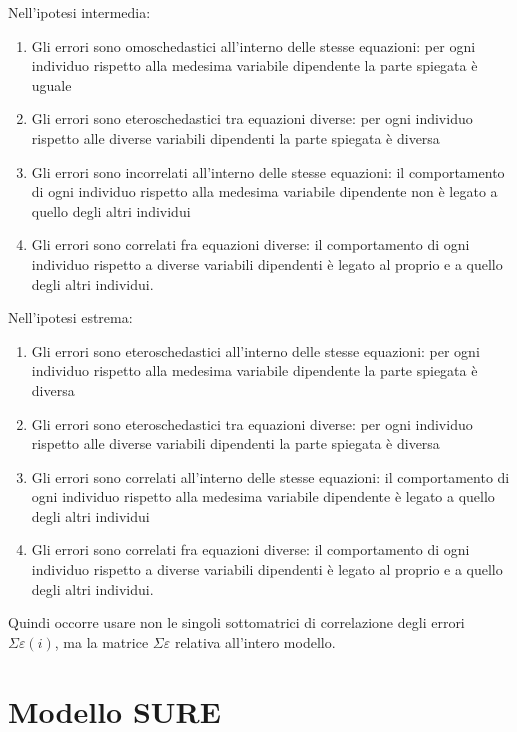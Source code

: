 \documentclass[a4page, 11pt]{article} %
\begin{document}
Nell’ipotesi intermedia:
\begin{enumerate}

\item Gli errori sono omoschedastici all’interno delle stesse equazioni: per ogni individuo rispetto alla medesima variabile dipendente la parte spiegata è uguale
\item Gli errori sono eteroschedastici tra equazioni diverse: per ogni individuo rispetto alle diverse variabili dipendenti la parte spiegata è diversa
\item Gli errori sono incorrelati all’interno delle stesse equazioni: il comportamento di ogni individuo rispetto alla medesima variabile dipendente non è legato a quello degli altri individui
\item Gli errori sono correlati fra equazioni diverse: il comportamento di ogni individuo rispetto a diverse variabili dipendenti è legato al proprio e a quello degli altri individui.
\end{enumerate}
Nell’ipotesi estrema:
\begin{enumerate}

\item Gli errori sono eteroschedastici all’interno delle stesse equazioni: per ogni individuo rispetto alla medesima variabile dipendente la parte spiegata è diversa
\item Gli errori sono eteroschedastici tra equazioni diverse: per ogni individuo rispetto alle diverse variabili dipendenti la parte spiegata è diversa
\item Gli errori sono correlati all’interno delle stesse equazioni: il comportamento di ogni individuo rispetto alla medesima variabile dipendente è legato a quello degli altri individui
\item Gli errori sono correlati fra equazioni diverse: il comportamento di ogni individuo rispetto a diverse variabili dipendenti è legato al proprio e a quello degli altri individui.
\end{enumerate}
Quindi occorre usare non le singoli sottomatrici di correlazione degli errori $\Sigma\varepsilon(i)$, ma la matrice $\Sigma\varepsilon$ relativa all’intero modello.

\section{Modello SURE}
\end{document}
